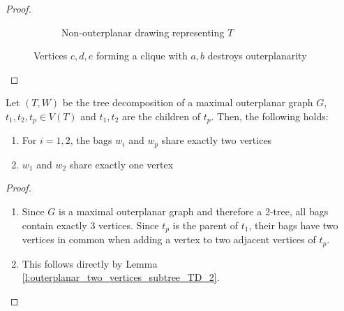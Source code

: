 \begin{proof}
\begin{figure}[H]
\begin{subfigure}{0.45\textwidth}
	\caption{Non-outerplanar drawing representing $T$}
\end{subfigure}
		\caption{Vertices $c,d,e$ forming a clique with $a,b$ destroys outerplanarity}\label{im:tree_decomposition_destroying_outerplanarity}
	\end{figure}
	
\end{proof}

\begin{lemma}\label{l:outerplanar_TD_properties}
	Let $(T,W)$ be the tree decomposition of a maximal outerplanar graph $G$, $t_1,t_2,t_p \in V(T)$ and $t_1, t_2$ are the children of $t_p$. Then, the following holds:
	\begin{enumerate}
		\item For $i = 1,2$, the bags $w_i$ and $w_p$ share exactly two vertices
		\item $w_1$ and $w_2$ share exactly one vertex
	\end{enumerate}
\end{lemma}
\begin{proof}
	\begin{enumerate}
		\item Since $G$ is a maximal outerplanar graph and therefore a 2-tree, all bags contain exactly 3 vertices. Since $t_p$ is the parent of $t_1$, their bags have two vertices in common when adding a vertex to two adjacent vertices of $t_p$.
		\item This follows directly by Lemma \ref{l:outerplanar_two_vertices_subtree_TD_2}.
	\end{enumerate}
\end{proof}

